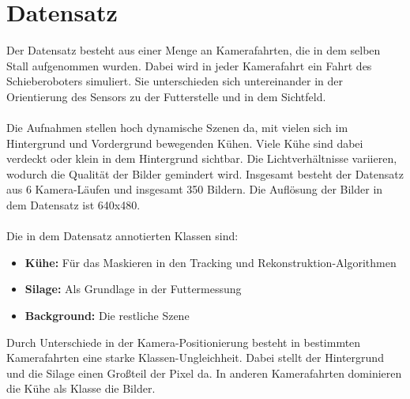 \documentclass[12pt,DIV=15,BCOR=15mm,twoside,headsepline,abstract=true,listof=totoc,bibliography=totoc]{scrreprt}
\theoremstyle{remark}    %
\begin{document}
    \section{Datensatz}
    Der Datensatz besteht aus einer Menge an Kamerafahrten, die in dem selben Stall aufgenommen wurden. Dabei wird in jeder Kamerafahrt ein Fahrt des 
    Schieberoboters simuliert. Sie unterschieden sich untereinander in der Orientierung des Sensors zu der Futterstelle und in dem Sichtfeld.\\\\
    Die Aufnahmen stellen hoch dynamische Szenen da, mit vielen sich im Hintergrund und Vordergrund bewegenden Kühen. Viele Kühe sind dabei verdeckt oder 
    klein in dem Hintergrund sichtbar. Die Lichtverhältnisse variieren, wodurch die Qualität der Bilder gemindert wird.
    Insgesamt besteht der Datensatz aus 6 Kamera-Läufen und insgesamt 350 Bildern. Die Auflösung der Bilder in dem Datensatz ist 640x480.\\\\ 
    Die in dem Datensatz annotierten Klassen sind:
    \begin{itemize}
        \item \textbf{Kühe:} Für das Maskieren in den Tracking und Rekonstruktion-Algorithmen
        \item \textbf{Silage:} Als Grundlage in der Futtermessung
        \item \textbf{Background:} Die restliche Szene
    \end{itemize}\noindent
    Durch Unterschiede in der Kamera-Positionierung besteht in bestimmten Kamerafahrten eine starke Klassen-Ungleichheit. Dabei stellt der Hintergrund und die Silage
    einen Großteil der Pixel da. In anderen Kamerafahrten dominieren die Kühe als Klasse die Bilder.
\end{document}
